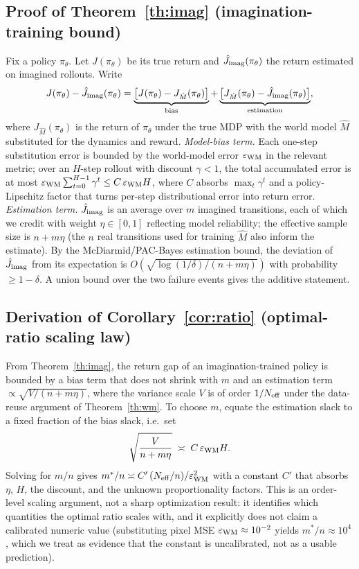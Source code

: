\documentclass[preprint,12pt]{elsarticle}
\begin{document}
\subsection{Proof of Theorem~\ref{th:imag} (imagination-training bound)}
Fix a policy $\pi_\theta$. Let $J(\pi_\theta)$ be its true return and
$\hat J_{\rm imag}(\pi_\theta)$ the return estimated on imagined rollouts.
Write
\[
  J(\pi_\theta)-\hat J_{\rm imag}(\pi_\theta)
  = \underbrace{\big[J(\pi_\theta)-J_{\hat M}(\pi_\theta)\big]}_{\text{bias}}
    + \underbrace{\big[J_{\hat M}(\pi_\theta)-\hat J_{\rm imag}(\pi_\theta)\big]}_{\text{estimation}},
\]
where $J_{\hat M}(\pi_\theta)$ is the return of $\pi_\theta$ under the true
MDP with the world model $\hat M$ substituted for the dynamics and reward.
\emph{Model-bias term.} Each one-step substitution error is bounded by the
world-model error $\varepsilon_{\rm WM}$ in the relevant metric; over an
$H$-step rollout with discount $\gamma<1$, the total accumulated error is at
most
$\varepsilon_{\rm WM}\sum_{t=0}^{H-1}\gamma^t\le C\,\varepsilon_{\rm WM}H$,
where $C$ absorbs $\max_t\gamma^t$ and a policy-Lipschitz factor that turns
per-step distributional error into return error. \emph{Estimation term.}
$\hat J_{\rm imag}$ is an average over $m$ imagined transitions, each of
which we credit with weight $\eta\in[0,1]$ reflecting model reliability; the
effective sample size is $n+m\eta$ (the $n$ real transitions used for
training $\hat M$ also inform the estimate). By the McDiarmid/PAC-Bayes
estimation bound, the deviation of $\hat J_{\rm imag}$ from its expectation
is $O(\sqrt{\log(1/\delta)/(n+m\eta)})$ with probability $\ge1-\delta$. A
union bound over the two failure events gives the additive statement.

\subsection{Derivation of Corollary~\ref{cor:ratio} (optimal-ratio scaling law)}
From Theorem~\ref{th:imag}, the return gap of an imagination-trained policy
is bounded by a bias term that does not shrink with $m$ and an estimation
term $\propto\sqrt{V/(n+m\eta)}$, where the variance scale $V$ is of order
$1/N_{\rm eff}$ under the data-reuse argument of Theorem~\ref{th:wm}. To
choose $m$, equate the estimation slack to a fixed fraction of the bias
slack, i.e.\ set
\[
  \sqrt{\frac{V}{n+m\eta}}\;\asymp\;C\,\varepsilon_{\rm WM}H.
\]
Solving for $m/n$ gives $m^*/n\asymp C'\,(N_{\rm eff}/n)/\varepsilon_{\rm WM}^2$
with a constant $C'$ that absorbs $\eta$, $H$, the discount, and the unknown
proportionality factors. This is an order-level scaling argument, not a
sharp optimization result: it identifies which quantities the optimal ratio
scales with, and it explicitly does not claim a calibrated numeric value
(substituting pixel MSE $\varepsilon_{\rm WM}\approx10^{-2}$ yields
$m^*/n\approx10^4$, which we treat as evidence that the constant is
uncalibrated, not as a usable prediction).
\end{document}
